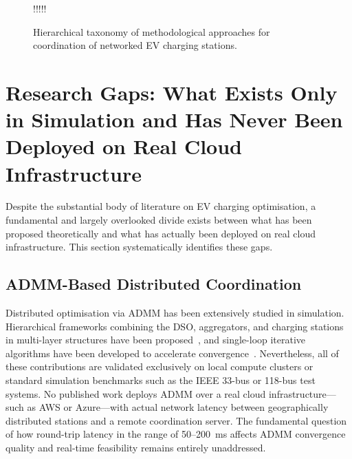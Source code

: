 \documentclass[review]{elsarticle}
\begin{document}
\begin{figure}[!htbp]
{
!!!!!}
\caption{Hierarchical taxonomy of methodological approaches for coordination of networked EV charging stations.}
\label{fig:taxonomy}
\end{figure}
\section{Research Gaps: What Exists Only in Simulation and Has Never Been Deployed on Real Cloud Infrastructure}

Despite the substantial body of literature on EV charging optimisation, 
a fundamental and largely overlooked divide exists between what has been 
proposed theoretically and what has actually been deployed on real 
cloud infrastructure. This section systematically identifies these gaps.

\subsection{ADMM-Based Distributed Coordination}

Distributed optimisation via ADMM has been extensively studied in 
simulation. Hierarchical frameworks combining the DSO, aggregators, 
and charging stations in multi-layer structures have been 
proposed~\cite{khaki2019hierarchical, zhang2022distributed, boyd2010admm}, 
and single-loop iterative algorithms have been developed to accelerate 
convergence~\cite{ma2013decentralized, yang2016distributed}. 
Nevertheless, all of these contributions are validated exclusively on 
local compute clusters or standard simulation benchmarks such as the 
IEEE 33-bus or 118-bus test systems. No published work deploys ADMM 
over a real cloud infrastructure---such as AWS or Azure---with actual 
network latency between geographically distributed stations and a 
remote coordination server. The fundamental question of how round-trip 
latency in the range of 50--200~ms affects ADMM convergence quality 
and real-time feasibility remains entirely unaddressed.
\end{document}
